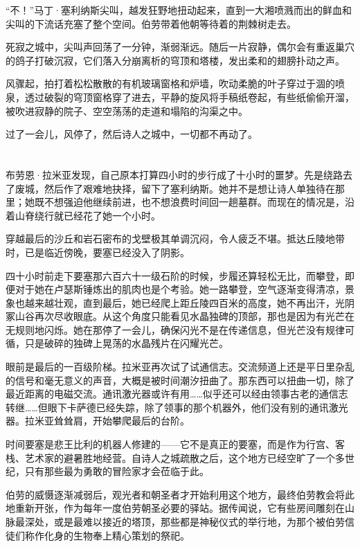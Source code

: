 \documentclass[AutoFakeBold=true]{book}
\begin{document}
``不！''马丁·塞利纳斯尖叫，越发狂野地扭动起来，直到一大湘喷溅而出的鲜血和尖叫的下流话充塞了整个空间。伯劳带着他朝等待着的荆棘树走去。

死寂之城中，尖叫声回荡了一分钟，渐弱渐远。随后一片寂静，偶尔会有重返巢穴的鸽子打破沉寂，它们落入分崩离析的穹顶和塔楼，发出柔和的翅膀扑动之声。

风骤起，拍打着松松散散的有机玻璃窗格和炉墙，吹动柔脆的叶子穿过于涸的喷泉，透过破裂的穹顶窗格穿了进去，平静的旋风将手稿纸卷起，有些纸偷偷开溜，被吹进寂静的院子、空空荡荡的走道和塌陷的沟渠之中。

过了一会儿，风停了，然后诗人之城中，一切都不再动了。

\chapter{}

布劳恩·拉米亚发现，自己原本打算四小时的步行成了十小时的噩梦。先是绕路去了废城，然后作了艰难地抉择，留下了塞利纳斯。她并不是想让诗人单独待在那里；她既不想强迫他继续前进，也不想浪费时间回一趟墓群。而现在的情况是，沿着山脊绕行就已经花了她一个小时。

穿越最后的沙丘和岩石密布的戈壁极其单调沉闷，令人疲乏不堪。抵达丘陵地带时，已是临近傍晚，要塞已经没入了阴影。

四十小时前走下要塞那六百六十一级石阶的时候，步履还算轻松无比，而攀登，即便对于她在卢瑟斯锤炼出的肌肉也是个考验。她一路攀登，空气逐渐变得清凉，景象也越来越壮观，直到最后，她已经爬上距丘陵四百米的高度，她不再出汗，光阴冢山谷再次尽收眼底。从这个角度只能看见水晶独碑的顶部，那也是因为有光芒在无规则地闪烁。她在那停了一会儿，确保闪光不是在传递信息，但光芒没有规律可循，只是破碎的独碑上晃荡的水晶残片在闪耀光芒。

眼前是最后的一百级阶梯。拉米亚再次试了试通信志。交流频道上还是平日里杂乱的信号和毫无意义的声音，大概是被时间潮汐扭曲了。那东西可以扭曲一切，除了最近距离的电磁交流。通讯激光器或许有用……似乎还可以经由领事古老的通信志转继……但眼下卡萨德已经失踪，除了领事的那个机器外，他们没有别的通讯激光器。拉米亚耸耸肩，开始攀爬最后的台阶。

时间要塞是悲王比利的机器人修建的——它不是真正的要塞，而是作为行宫、客栈、艺术家的避暑胜地经营。自诗人之城疏散之后，这个地方已经空旷了一个多世纪，只有那些最为勇敢的冒险家才会莅临于此。

伯劳的威慑逐渐减弱后，观光者和朝圣者才开始利用这个地方，最终伯劳教会将此地重新开张，作为每年一度伯劳朝圣必要的驿站。据传闻说，它有些房间雕刻在山脉最深处，或是最难以接近的塔顶，那些都是神秘仪式的举行地，为那个被伯劳信徒们称作化身的生物奉上精心策划的祭祀。
\end{document}
